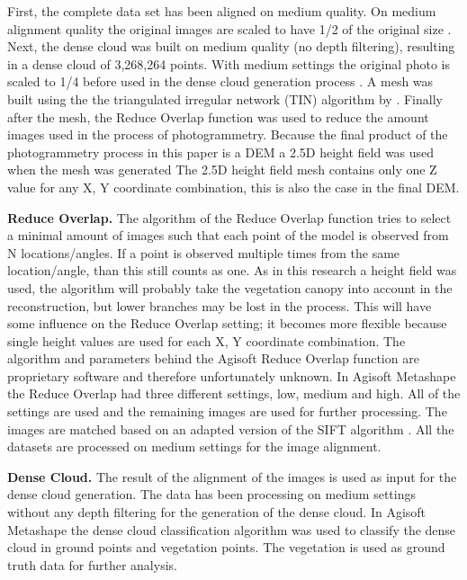 \documentclass{isprs} %
\begin{document}
First, the complete data set has been aligned on medium quality.
On medium alignment quality the original images are scaled to have 1/2 of the original size \citep{manual}.
Next, the dense cloud was built on medium quality (no depth filtering), resulting in a dense cloud of 3,268,264 points.
With medium settings the original photo is scaled to 1/4 before used in the dense cloud generation process \citep{manual}.
A mesh was built using the the triangulated irregular network (TIN) algorithm by \citet{axelsson1999processing}. 
Finally after the mesh, the Reduce Overlap function was used to reduce the amount images used in the process of photogrammetry. 
Because the final product of the photogrammetry process in this paper is a DEM a 2.5D height field was used when the mesh was generated
The 2.5D height field mesh contains only one Z value for any X, Y coordinate combination, this is also the case in the final DEM.

\textbf{Reduce Overlap.} 
The algorithm of the Reduce Overlap function tries to select a minimal amount of images such that each point of the model is observed from N locations/angles.
If a point is observed multiple times from the same location/angle, than this still counts as one. 
As in this research a height field was used, the algorithm will probably take the vegetation canopy into account in the reconstruction, but lower branches may be lost in the process.
This will have some influence on the Reduce Overlap setting; it becomes more flexible because single height values are used for each X, Y coordinate combination.
The algorithm and parameters behind the Agisoft Reduce Overlap function are proprietary software and therefore unfortunately unknown.
In Agisoft Metashape the Reduce Overlap had three different settings, low, medium and high. 
All of the settings are used and the remaining images are used for further processing.
The images are matched based on an adapted version of the SIFT algorithm \citep{lowe1999object, AgisoftMetashape}.
All the datasets are processed on medium settings for the image alignment.

\textbf{Dense Cloud.}
The result of the alignment of the images is used as input for the dense cloud generation.
The data has been processing on medium settings without any depth filtering for the generation of the dense cloud. 
In Agisoft Metashape the dense cloud classification algorithm was used to classify the dense cloud in ground points and vegetation points. 
The vegetation is used as ground truth data for further analysis.
\end{document}
